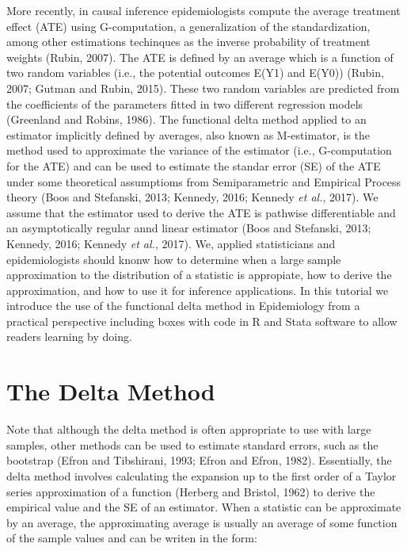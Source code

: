 \documentclass[]{article}
\begin{document}
More recently, in causal inference epidemiologists compute the average
treatment effect (ATE) using G-computation, a generalization of the
standardization, among other estimations techinques as the inverse
probability of treatment weights (Rubin, 2007). The ATE is defined by an
average which is a function of two random variables (i.e., the potential
outcomes E(Y1) and E(Y0)) (Rubin, 2007; Gutman and Rubin, 2015). These
two random variables are predicted from the coefficients of the
parameters fitted in two different regression models (Greenland and
Robins, 1986). The functional delta method applied to an estimator
implicitly defined by averages, also known as M-estimator, is the method
used to approximate the variance of the estimator (i.e., G-computation
for the ATE) and can be used to estimate the standar error (SE) of the
ATE under some theoretical assumptioms from Semiparametric and Empirical
Process theory (Boos and Stefanski, 2013; Kennedy, 2016; Kennedy
\emph{et al.}, 2017). We assume that the estimator used to derive the
ATE is pathwise differentiable and an asymptotically regular annd linear
estimator (Boos and Stefanski, 2013; Kennedy, 2016; Kennedy \emph{et
al.}, 2017). We, applied statisticians and epidemiologists should knonw
how to determine when a large sample approximation to the distribution
of a statistic is appropiate, how to derive the approximation, and how
to use it for inference applications. In this tutorial we introduce the
use of the functional delta method in Epidemiology from a practical
perspective including boxes with code in R and Stata software to allow
readers learning by doing.

\hypertarget{the-delta-method}{%
\section{The Delta Method}\label{the-delta-method}}

Note that although the delta method is often appropriate to use with
large samples, other methods can be used to estimate standard errors,
such as the bootstrap (Efron and Tibshirani, 1993; Efron and Efron,
1982). Essentially, the delta method involves calculating the expansion
up to the first order of a Taylor series approximation of a function
(Herberg and Bristol, 1962) to derive the empirical value and the SE of
an estimator. When a statistic can be approximate by an average, the
approximating average is usually an average of some function of the
sample values and can be writen in the form:
\end{document}
